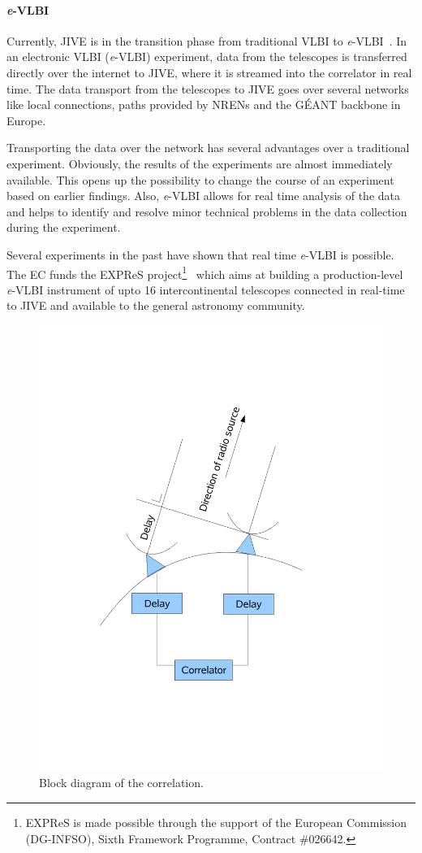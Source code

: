 \paragraph{{\it e}-VLBI}
Currently, JIVE is in the transition phase from traditional VLBI to
{\it e}-VLBI~\cite{szomoru-2004}. In an electronic VLBI ({\it e}-VLBI)
experiment, data from the telescopes is transferred directly over the
internet to JIVE, where it is streamed into the correlator in real
time. The data transport from the telescopes to JIVE goes over several
networks like local connections, paths provided by NRENs and the
G\'EANT backbone in Europe.

Transporting the data over the network has several advantages over a
traditional experiment. Obviously, the results of the experiments are
almost immediately available. This opens up the possibility to change
the course of an experiment based on earlier findings. Also, {\it
  e}-VLBI allows for real time analysis of the data and helps to
identify and resolve minor technical problems in the data collection
during the experiment.

Several experiments in the past have shown that real time {\it e}-VLBI
is possible. The EC funds the EXPReS project\footnote{EXPReS is made
  possible through the support of the European Commission (DG-INFSO),
  Sixth Framework Programme, Contract \#026642.}~\cite{EXPReS} which
aims at building a production-level {\it e}-VLBI instrument of upto 16
intercontinental telescopes connected in real-time to JIVE and
available to the general astronomy community.

\begin{figure}
  \centering
  \includegraphics[width=.75\textwidth]
  {img/VLBI}
  \caption{Block diagram of the correlation.}
  \label{fig:correlation_diagram}
\end{figure}
